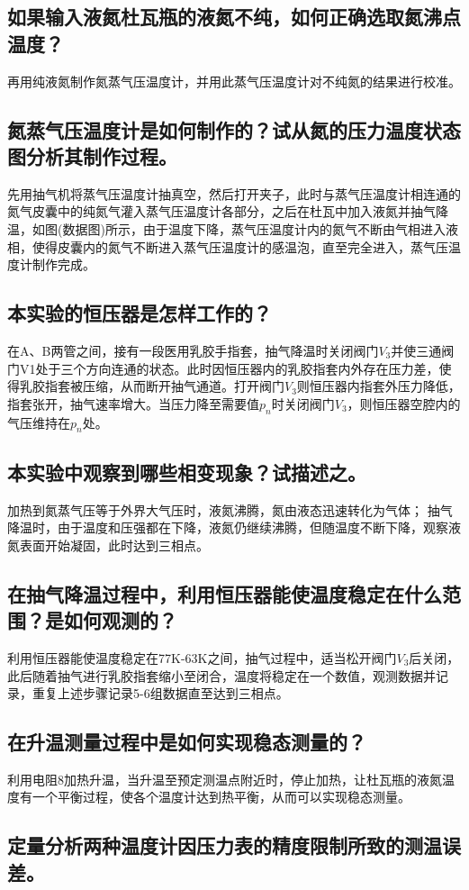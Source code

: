 \documentclass[a4paper]{article}
\begin{document}
\subsection{如果输入液氮杜瓦瓶的液氮不纯，如何正确选取氮沸点温度？}
再用纯液氮制作氮蒸气压温度计，并用此蒸气压温度计对不纯氮的结果进行校准。
\subsection{氮蒸气压温度计是如何制作的？试从氮的压力温度状态图分析其制作过程。}
先用抽气机将蒸气压温度计抽真空，然后打开夹子，此时与蒸气压温度计相连通的氮气皮囊中的纯氮气灌入蒸气压温度计各部分，之后在杜瓦中加入液氮并抽气降温，如图(数据图)所示，由于温度下降，蒸气压温度计内的氮气不断由气相进入液相，使得皮囊内的氮气不断进入蒸气压温度计的感温泡，直至完全进入，蒸气压温度计制作完成。
\subsection{本实验的恒压器是怎样工作的？}
在A、B两管之间，接有一段医用乳胶手指套，抽气降温时关闭阀门$V_3$并使三通阀门V1处于三个方向连通的状态。此时因恒压器内的乳胶指套内外存在压力差，使得乳胶指套被压缩，从而断开抽气通道。打开阀门$V_3$则恒压器内指套外压力降低，指套张开，抽气速率增大。当压力降至需要值$p_n$时关闭阀门$V_3$，则恒压器空腔内的气压维持在$p_n$处。
\subsection{本实验中观察到哪些相变现象？试描述之。}
加热到氮蒸气压等于外界大气压时，液氮沸腾，氮由液态迅速转化为气体；
抽气降温时，由于温度和压强都在下降，液氮仍继续沸腾，但随温度不断下降，观察液氮表面开始凝固，此时达到三相点。
\subsection{在抽气降温过程中，利用恒压器能使温度稳定在什么范围？是如何观测的？}
利用恒压器能使温度稳定在77K-63K之间，抽气过程中，适当松开阀门$V_3$后关闭，此后随着抽气进行乳胶指套缩小至闭合，温度将稳定在一个数值，观测数据并记录，重复上述步骤记录5-6组数据直至达到三相点。
\subsection{在升温测量过程中是如何实现稳态测量的？}
利用电阻8加热升温，当升温至预定测温点附近时，停止加热，让杜瓦瓶的液氮温度有一个平衡过程，使各个温度计达到热平衡，从而可以实现稳态测量。
\subsection{定量分析两种温度计因压力表的精度限制所致的测温误差。}
\end{document}
